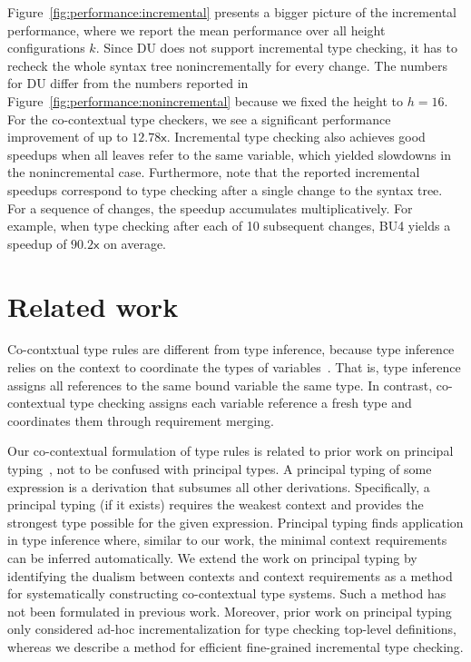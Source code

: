 \documentclass{llncs}
\begin{document}
Figure~\ref{fig:performance:incremental} presents a bigger picture of the
incremental performance, where we report the mean performance over all height
configurations $k$. Since DU does not support incremental type checking, it has
to recheck the whole syntax tree nonincrementally for every change.  The numbers
for DU differ from the numbers reported in
Figure~\ref{fig:performance:nonincremental} because we fixed the height to
$h=16$. For the co-contextual type checkers, we see a significant performance
improvement of up to $12.78\textsf{x}$. Incremental type checking also achieves
good speedups when all leaves refer to the same variable, which yielded
slowdowns in the nonincremental case. Furthermore, note that the reported
incremental speedups correspond to type checking after a single change to the
syntax tree. For a sequence of changes, the speedup accumulates
multiplicatively. For example, when type checking after each of 10 subsequent
changes, BU4 yields a speedup of $90.2\textsf{x}$ on average.


\section{Related work}
\label{sec:related}


Co-contxtual type rules are different from type inference, because type
inference relies on the context to coordinate the types of
variables~\cite{Milner78}. That is, type inference assigns all references to
the same bound variable the same type. In contrast, co-contextual type checking
assigns each variable reference a fresh type and coordinates them through
requirement merging.

Our co-contextual formulation of type rules is related to prior work on
principal typing~\cite{Jim96,Wells02}, not to be confused with principal
types. A principal typing of some expression is a derivation that subsumes all
other derivations. Specifically, a principal typing (if it exists) requires the
weakest context and provides the strongest type possible for the given
expression. Principal typing finds application in type inference where, similar
to our work, the minimal context requirements can be inferred automatically. We
extend the work on principal typing by identifying the dualism between contexts
and context requirements as a method for systematically constructing
co-contextual type systems. Such a method has not been formulated in previous
work. Moreover, prior work on principal typing only considered ad-hoc
incrementalization for type checking top-level definitions, whereas we describe
a method for efficient fine-grained incremental type checking.
\end{document}
